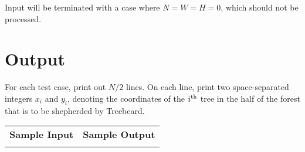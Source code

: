 \documentclass{article}
\begin{document}


Input will be terminated with a case where $N = W = H = 0$, which should not be processed.

\section{Output}

For each test case, print out $N/2$ lines.  On each line, print two
space-separated integers $x_i$ and $y_i$, denoting the coordinates of the 
$i^{\mbox{\scriptsize{th}}}$
tree in the half of the forest that is to be shepherded by Treebeard.


\vskip 16pt
\noindent
\setlength{\extrarowheight}{4pt}
\begin{tabularx}{\textwidth}{ | X | X | }
\hline
\textbf{Sample Input} & \textbf{Sample Output} \\

&

\\
\hline
\end{tabularx}
\end{document}
